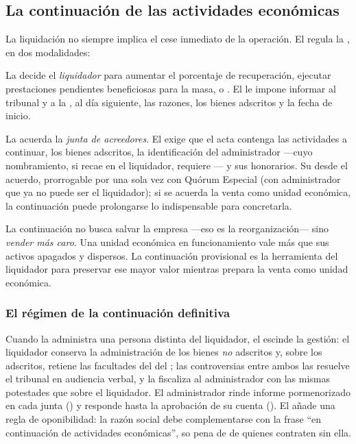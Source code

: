 \subsection{La continuación de las actividades económicas}

La liquidación no siempre implica el cese inmediato de la operación. El  regula la
, en dos modalidades:

\begin{description}[leftmargin=0pt,style=nextline,font=\sffamily\bfseries]
  \item[Provisional] La decide el \emph{liquidador} para aumentar el porcentaje de recuperación,
  ejecutar prestaciones pendientes beneficiosas para la masa, o . El  le impone informar al tribunal
  y a la \superir{}, al día siguiente, las razones, los bienes adscritos y la fecha de inicio.

  \item[Definitiva] La acuerda la \emph{junta de acreedores}. El  exige que el acta
  contenga las actividades a continuar, los bienes adscritos, la identificación del administrador
  ---cuyo nombramiento, si recae en el liquidador, requiere --- y sus
  honorarios. Su  desde el acuerdo, prorrogable por una
  sola vez con Quórum Especial (con administrador que ya no puede ser el liquidador); si se acuerda
  la venta como unidad económica, la continuación puede prolongarse lo indispensable para
  concretarla.
\end{description}

\begin{foco}
La continuación no busca salvar la empresa ---eso es la reorganización--- sino \emph{vender más
caro}. Una unidad económica en funcionamiento vale más que sus activos apagados y dispersos. La
continuación provisional es la herramienta del liquidador para preservar ese mayor valor
mientras prepara la venta como unidad económica.
\end{foco}

\subsubsection{El régimen de la continuación definitiva}

Cuando la administra una persona distinta del liquidador, el  escinde la gestión: el
liquidador conserva la administración de los bienes \emph{no} adscritos y, sobre los adscritos,
retiene las facultades del  del \cpc{}; las controversias entre ambos las resuelve el
tribunal en audiencia verbal, y la \superir{} fiscaliza al administrador con las mismas potestades
que sobre el liquidador. El administrador rinde informe pormenorizado en cada junta () y
responde  hasta la aprobación de su cuenta (). El
 añade una regla de oponibilidad: la razón social debe complementarse con la frase
\enquote{en continuación de actividades económicas}, so pena de  de quienes contraten sin ella.

